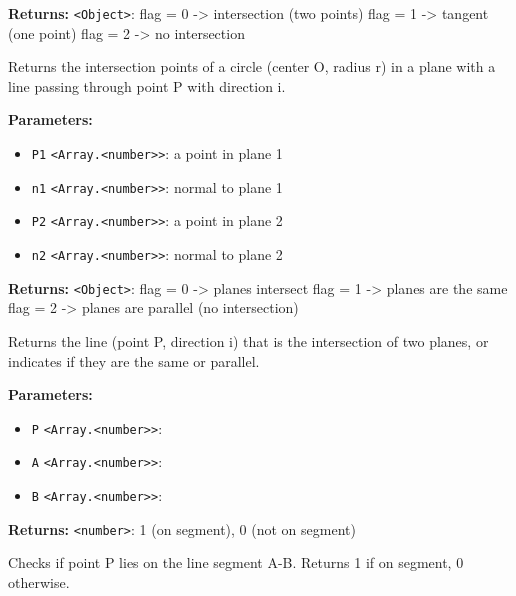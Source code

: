 \documentclass[12pt,a4paper]{article}
\begin{document}
\noindent \textbf{Returns:} \texttt{<Object>}: flag = 0 -> intersection (two points)
flag = 1 -> tangent (one point)
flag = 2 -> no intersection

\noindent Returns the intersection points of a circle (center O, radius r)
in a plane with a line passing through point P with direction i.

\vspace{5mm}
\noindent {}


\noindent \textbf{Parameters:}
\begin{itemize}
  \item \texttt{P1} \texttt{<Array.<number>>}: a point in plane 1
  \item \texttt{n1} \texttt{<Array.<number>>}: normal to plane 1
  \item \texttt{P2} \texttt{<Array.<number>>}: a point in plane 2
  \item \texttt{n2} \texttt{<Array.<number>>}: normal to plane 2
\end{itemize}

\noindent \textbf{Returns:} \texttt{<Object>}: flag = 0 -> planes intersect
flag = 1 -> planes are the same
flag = 2 -> planes are parallel (no intersection)

\noindent Returns the line (point P, direction i) that is the intersection
of two planes, or indicates if they are the same or parallel.

\vspace{5mm}
\noindent {}


\noindent \textbf{Parameters:}
\begin{itemize}
  \item \texttt{P} \texttt{<Array.<number>>}:
  \item \texttt{A} \texttt{<Array.<number>>}:
  \item \texttt{B} \texttt{<Array.<number>>}:
\end{itemize}

\noindent \textbf{Returns:} \texttt{<number>}: 1 (on segment), 0 (not on segment)

\noindent Checks if point P lies on the line segment A-B.
Returns 1 if on segment, 0 otherwise.
\end{document}
